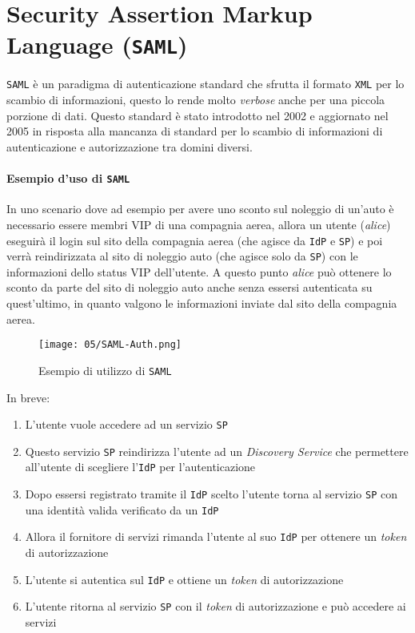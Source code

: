 \section{Security Assertion Markup Language (\texttt{SAML})}
    \texttt{SAML} è un paradigma di autenticazione standard che sfrutta il formato \texttt{XML} per lo scambio di informazioni, questo lo rende molto \textit{verbose} anche per una piccola porzione di dati. Questo standard è stato introdotto nel 2002 e aggiornato nel 2005 in risposta alla mancanza di standard per lo scambio di informazioni di autenticazione e autorizzazione tra domini diversi.
    
    \paragraph{Esempio d'uso di \texttt{SAML}} In uno scenario dove ad esempio per avere uno sconto sul noleggio di un'auto è necessario essere membri VIP di una compagnia aerea, allora un utente (\textit{alice}) eseguirà il login sul sito della compagnia aerea (che agisce da \texttt{IdP} e \texttt{SP}) e poi verrà reindirizzata al sito di noleggio auto (che agisce solo da \texttt{SP}) con le informazioni dello status VIP dell'utente. A questo punto \textit{alice} può ottenere lo sconto da parte del sito di noleggio auto anche senza essersi autenticata su quest'ultimo, in quanto valgono le informazioni inviate dal sito della compagnia aerea.
    
    \begin{wrapfigure}{r}{0.2\textwidth}
        \centering
        \texttt{[image: 05/SAML-Auth.png]}
        \caption{Esempio di utilizzo di \texttt{SAML}}
    \end{wrapfigure}
    In breve:
        \begin{enumerate}
            \item L'utente vuole accedere ad un servizio \texttt{SP}
            \item Questo servizio \texttt{SP} reindirizza l'utente ad un \textit{Discovery Service} che permettere all'utente di scegliere l'\texttt{IdP} per l'autenticazione
            \item Dopo essersi registrato tramite il \texttt{IdP} scelto l'utente torna al servizio \texttt{SP} con una identità valida verificato da un \texttt{IdP}
            \item Allora il fornitore di servizi rimanda l'utente al suo \texttt{IdP} per ottenere un \textit{token} di autorizzazione
            \item L'utente si autentica sul \texttt{IdP} e ottiene un \textit{token} di autorizzazione
            \item L'utente ritorna al servizio \texttt{SP} con il \textit{token} di autorizzazione e può accedere ai servizi
        \end{enumerate}
    
